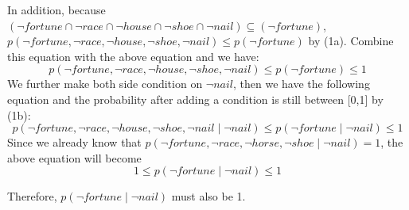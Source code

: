 \documentclass{article}
\begin{document}
\noindent
In addition, because $(\neg fortune \cap \neg race \cap \neg house \cap \neg shoe \cap \neg nail) \subseteq (\neg fortune)$, $p(\neg fortune, \neg race, \neg house, \neg shoe, \neg nail) \leq p(\neg fortune)$ by (1a). Combine this equation with the above equation and we have:\\
$$p(\neg fortune, \neg race, \neg house, \neg shoe, \neg nail) \leq p(\neg fortune) \leq 1$$ 
We further make both side condition on $\neg nail$, then we have the following equation and the probability after adding a condition is still between [0,1] by (1b):\\
$$p(\neg fortune, \neg race, \neg house, \neg shoe, \neg nail \mid \neg nail) \leq p(\neg fortune \mid \neg nail) \leq 1$$
Since we already know that $p(\neg fortune, \neg race, \neg horse, \neg shoe \mid \neg nail) = 1$, the above equation will become\\
$$1 \leq p(\neg fortune \mid \neg nail) \leq 1$$

\noindent
Therefore, $p(\neg fortune \mid \neg nail)$ must also be 1.
\end{document}
